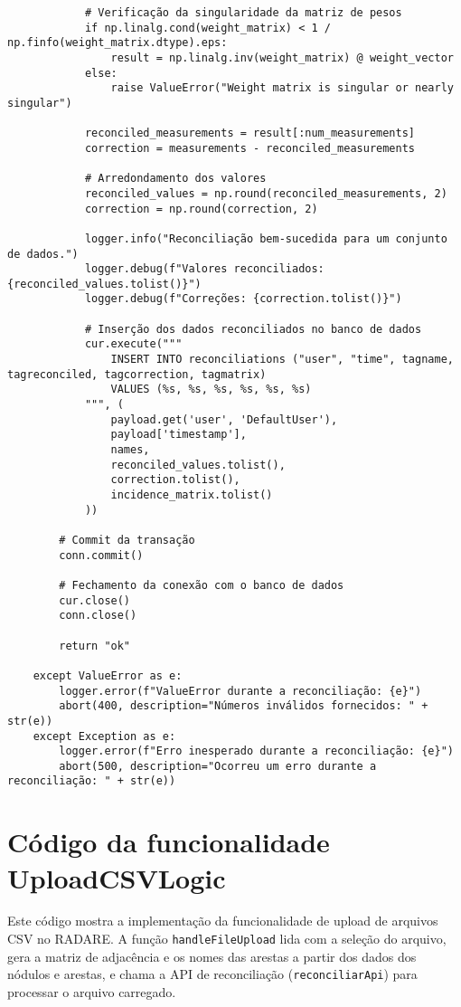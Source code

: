 \begin{verbatim}
            # Verificação da singularidade da matriz de pesos
            if np.linalg.cond(weight_matrix) < 1 / np.finfo(weight_matrix.dtype).eps:
                result = np.linalg.inv(weight_matrix) @ weight_vector
            else:
                raise ValueError("Weight matrix is singular or nearly singular")

            reconciled_measurements = result[:num_measurements]
            correction = measurements - reconciled_measurements

            # Arredondamento dos valores
            reconciled_values = np.round(reconciled_measurements, 2)
            correction = np.round(correction, 2)

            logger.info("Reconciliação bem-sucedida para um conjunto de dados.")
            logger.debug(f"Valores reconciliados: {reconciled_values.tolist()}")
            logger.debug(f"Correções: {correction.tolist()}")

            # Inserção dos dados reconciliados no banco de dados
            cur.execute("""
                INSERT INTO reconciliations ("user", "time", tagname, tagreconciled, tagcorrection, tagmatrix)
                VALUES (%s, %s, %s, %s, %s, %s)
            """, (
                payload.get('user', 'DefaultUser'),
                payload['timestamp'],
                names,
                reconciled_values.tolist(),
                correction.tolist(),
                incidence_matrix.tolist()
            ))

        # Commit da transação
        conn.commit()

        # Fechamento da conexão com o banco de dados
        cur.close()
        conn.close()

        return "ok"

    except ValueError as e:
        logger.error(f"ValueError durante a reconciliação: {e}")
        abort(400, description="Números inválidos fornecidos: " + str(e))
    except Exception as e:
        logger.error(f"Erro inesperado durante a reconciliação: {e}")
        abort(500, description="Ocorreu um erro durante a reconciliação: " + str(e))
\end{verbatim}


\chapter{Código da funcionalidade UploadCSVLogic}
\label{Anexo:UploadCSVLogic}

Este código mostra a implementação da funcionalidade de upload de arquivos CSV no RADARE. A função \texttt{handleFileUpload} lida com a seleção do arquivo, gera a matriz de adjacência e os nomes das arestas a partir dos dados dos nódulos e arestas, e chama a API de reconciliação (\texttt{reconciliarApi}) para processar o arquivo carregado.

